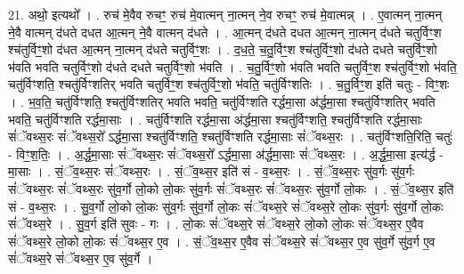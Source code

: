 \documentclass[17pt]{extarticle}
\begin{document}
21. अथो॒ इत्यथो᳚ । . रुच॑ मे॒वैव रुचꣳ॒॒ रुच॑ मे॒वात्मन् ना॒त्मन् ने॒व रुचꣳ॒॒ रुच॑ मे॒वात्मन्न् । . ए॒वात्मन् ना॒त्मन् ने॒वै वात्मन् द॑धते दधत आ॒त्मन् ने॒वै वात्मन् द॑धते । . आ॒त्मन् द॑धते दधत आ॒त्मन् ना॒त्मन् द॑धते चतुर्विꣳ॒॒श श्च॑तुर्विꣳ॒॒शो द॑धत आ॒त्मन् ना॒त्मन् द॑धते चतुर्विꣳ॒॒शः । . द॒ध॒ते॒ च॒तु॒र्विꣳ॒॒श श्च॑तुर्विꣳ॒॒शो द॑धते दधते चतुर्विꣳ॒॒शो भ॑वति भवति चतुर्विꣳ॒॒शो द॑धते दधते चतुर्विꣳ॒॒शो भ॑वति । . च॒तु॒र्विꣳ॒॒शो भ॑वति भवति चतुर्विꣳ॒॒श श्च॑तुर्विꣳ॒॒शो भ॑वति॒ चतु॑र्विꣳशति॒ श्चतु॑र्विꣳशतिर् भवति चतुर्विꣳ॒॒श श्च॑तुर्विꣳ॒॒शो भ॑वति॒ चतु॑र्विꣳशतिः । . च॒तु॒र्विꣳ॒॒श इति॑ चतुः - विꣳ॒॒शः । . भ॒व॒ति॒ चतु॑र्विꣳशति॒ श्चतु॑र्विꣳशतिर् भवति भवति॒ चतु॑र्विꣳशति रर्द्धमा॒सा अ॑र्द्धमा॒सा श्चतु॑र्विꣳशतिर् भवति भवति॒ चतु॑र्विꣳशति रर्द्धमा॒साः । . चतु॑र्विꣳशति रर्द्धमा॒सा अ॑र्द्धमा॒सा श्चतु॑र्विꣳशति॒ श्चतु॑र्विꣳशति रर्द्धमा॒साः सं॑ॅवथ्स॒रः सं॑ॅवथ्स॒रो᳚ ऽर्द्धमा॒सा श्चतु॑र्विꣳशति॒ श्चतु॑र्विꣳशति रर्द्धमा॒साः सं॑ॅवथ्स॒रः । . चतु॑र्विꣳशति॒रिति॒ चतुः॑ - विꣳ॒॒श॒तिः॒ । . अ॒र्द्ध॒मा॒साः सं॑ॅवथ्स॒रः सं॑ॅवथ्स॒रो᳚ ऽर्द्धमा॒सा अ॑र्द्धमा॒साः सं॑ॅवथ्स॒रः । . अ॒र्द्ध॒मा॒सा इत्य॑र्द्ध - मा॒साः । . सं॒ॅव॒थ्स॒रः सं॑ॅवथ्स॒रः । . सं॒ॅव॒थ्स॒र इति॑ सं - व॒थ्स॒रः । . सं॒ॅव॒थ्स॒रः सु॑व॒र्गः सु॑व॒र्गः सं॑ॅवथ्स॒रः सं॑ॅवथ्स॒रः सु॑व॒र्गो लो॒को लो॒कः सु॑व॒र्गः सं॑ॅवथ्स॒रः सं॑ॅवथ्स॒रः सु॑व॒र्गो लो॒कः । . सं॒ॅव॒थ्स॒र इति॑ सं - व॒थ्स॒रः । . सु॒व॒र्गो लो॒को लो॒कः सु॑व॒र्गः सु॑व॒र्गो लो॒कः सं॑ॅवथ्स॒रे सं॑ॅवथ्स॒रे लो॒कः सु॑व॒र्गः सु॑व॒र्गो लो॒कः सं॑ॅवथ्स॒रे । . सु॒व॒र्ग इति॑ सुवः - गः । . लो॒कः सं॑ॅवथ्स॒रे सं॑ॅवथ्स॒रे लो॒को लो॒कः सं॑ॅवथ्स॒र ए॒वैव सं॑ॅवथ्स॒रे लो॒को लो॒कः सं॑ॅवथ्स॒र ए॒व । . सं॒ॅव॒थ्स॒र ए॒वैव सं॑ॅवथ्स॒रे सं॑ॅवथ्स॒र ए॒व सु॑व॒र्गे सु॑व॒र्ग ए॒व सं॑ॅवथ्स॒रे सं॑ॅवथ्स॒र ए॒व सु॑व॒र्गे । \newline
\end{document}
